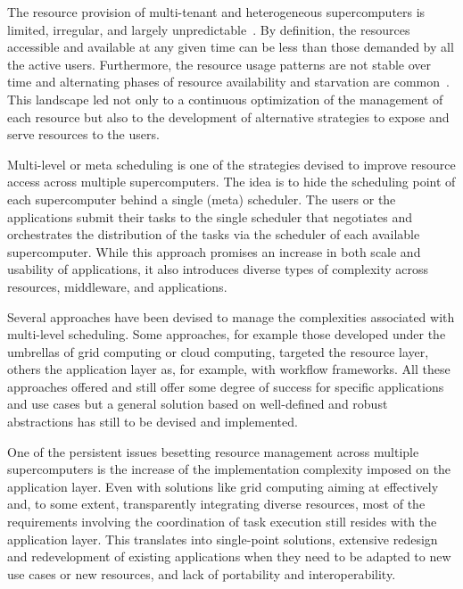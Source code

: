 \documentclass{sig-alternate}
\begin{document}
The resource provision of multi-tenant and heterogeneous supercomputers is
limited, irregular, and largely
unpredictable~\cite{downey1997,wolski2003,li2004,tsafrir2007}. By definition,
the resources accessible and available at any given time can be less than those
demanded by all the active users. Furthermore, the resource usage patterns are
not stable over time and alternating phases of resource availability and
starvation are common~\cite{Furlani2013,Lu2013}. This landscape led not only to
a continuous optimization of the management of each resource but also to the
development of alternative strategies to expose and serve resources to the
users.

Multi-level or meta scheduling  is one of the strategies devised to improve resource
access across multiple supercomputers. The idea is to hide the scheduling point
of each supercomputer behind a single (meta) scheduler. The users or the
applications submit their tasks to the single scheduler that negotiates and
orchestrates the distribution of the tasks via the scheduler of each available
supercomputer. While this approach promises an increase in both scale and
usability of applications, it also introduces diverse types of complexity across
resources, middleware, and applications.

Several approaches have been devised to manage the complexities associated with
multi-level scheduling. Some approaches, for example those developed under the
umbrellas of grid computing or cloud computing, targeted the resource layer, others the application
layer as, for example, with workflow frameworks. All these approaches offered
and still offer some degree of success for specific applications and use cases
but a general solution based on well-defined and robust abstractions has still
to be devised and implemented.

One of the persistent issues besetting resource management across multiple
supercomputers is the increase of the implementation complexity imposed on the
application layer. Even with solutions like grid computing aiming at effectively
and, to some extent, transparently integrating diverse resources, most of the
requirements involving the coordination of task execution still resides with the
application layer. This translates into single-point solutions, extensive
redesign and redevelopment of existing applications when they need to be adapted
to new use cases or new resources, and lack of portability and interoperability.
\end{document}
